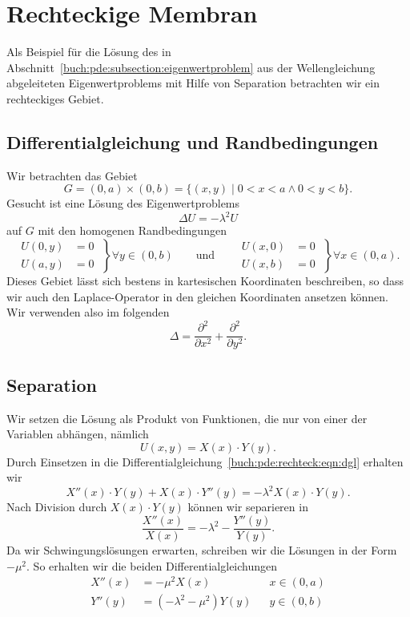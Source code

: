 %
%
%
\section{Rechteckige Membran
\label{buch:pde:section:rechteck}}
Als Beispiel für die Lösung des in
Abschnitt~\ref{buch:pde:subsection:eigenwertproblem}
aus der Wellengleichung abgeleiteten Eigenwertproblems
mit Hilfe von Separation betrachten wir ein rechteckiges Gebiet.

\subsection{Differentialgleichung und Randbedingungen}
Wir betrachten das Gebiet
\[
G
=
(0,a) \times (0,b) 
=
\{ (x,y) \mid 0< x <a\wedge 0<y<b\}.
\]
Gesucht ist eine Lösung des Eigenwertproblems
\begin{equation}
\Delta U = -\lambda^2 U
\label{buch:pde:rechteck:eqn:dgl}
\end{equation}
auf $G$ mit den homogenen Randbedingungen
\[
\left.
\begin{aligned}
U(0,y) &= 0\\
U(a,y) &= 0
\end{aligned}
\;
\right\}
\forall y \in (0,b)
\qquad
\text{und}
\qquad
\left.
\begin{aligned}
U(x,0) &= 0\\
U(x,b) &= 0
\end{aligned}
\;
\right\}
\forall x \in (0,a).
\]
Dieses Gebiet lässt sich bestens in kartesischen Koordinaten
beschreiben, so dass wir auch den Laplace-Operator in den
gleichen Koordinaten ansetzen können.
Wir verwenden also im folgenden
\[
\Delta = \frac{\partial^2}{\partial x^2} + \frac{\partial^2}{\partial y^2}.
\]


\subsection{Separation}
Wir setzen die Lösung als Produkt von Funktionen, die nur von einer
der Variablen abhängen, nämlich
\[
U(x,y)
=
X(x) \cdot Y(y).
\]
Durch Einsetzen in die
Differentialgleichung~\eqref{buch:pde:rechteck:eqn:dgl}
erhalten wir
\[
X''(x) \cdot Y(y) + X(x)\cdot Y''(y) = -\lambda^2 X(x)\cdot Y(y).
\]
Nach Division durch $X(x)\cdot Y(y)$ können wir separieren in 
\[
\frac{X''(x)}{X(x)}=-\lambda^2 - \frac{Y''(y)}{Y(y)}.
\]
Da wir Schwingungslösungen erwarten, schreiben wir die Lösungen
in der Form $-\mu^2$. 
So erhalten wir die beiden Differentialgleichungen
\[
\begin{aligned}
X''(x) &= -\mu^2 X(x)&&x\in (0,a)
\\
Y''(y) &= (-\lambda^2-\mu^2) Y(y)&& y\in(0,b)
\end{aligned}
\]

